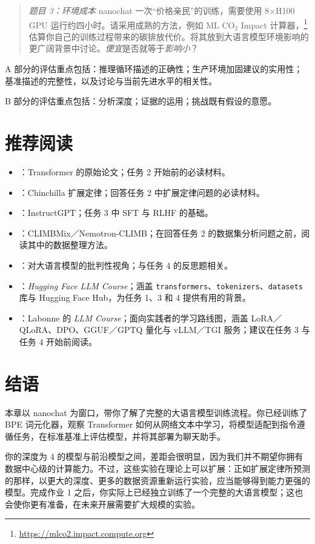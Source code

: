 \begin{quote}
{\em 题目 3：环境成本}
nanochat 一次“价格亲民”的训练，需要使用 8$\times$H100 GPU 运行约四小时。请采用成熟的方法，例如 ML CO$_2$ Impact 计算器，\footnote{\url{https://mlco2.impact.compute.org}}估算你自己的训练过程带来的碳排放代价。将其放到大语言模型环境影响的更广阔背景中讨论。{\em 便宜}是否就等于{\em 影响小}？
\end{quote}

A 部分的评估重点包括：推理循环描述的正确性；生产环境加固建议的实用性；基准描述的完整性，以及讨论与当前先进水平的相关性。

B 部分的评估重点包括：分析深度；证据的运用；挑战既有假设的意愿。

\section{推荐阅读}
\label{sec:reading}

\begin{itemize}
    \item \citet{vaswani2017attention}：Transformer 的原始论文；任务 2 开始前的必读材料。
    \item \citet{10.5555/3600270.3602446}：Chinchilla 扩展定律；回答任务 2 中扩展定律问题的必读材料。
    \item \citet{ouyang2022training}：InstructGPT；任务 3 中 SFT 与 RLHF 的基础。
    \item \citet{diao2026nemotron}：CLIMBMix／Nemotron-CLIMB；在回答任务 2 的数据集分析问题之前，阅读其中的数据整理方法。
    \item \citet{bender2021dangers}：对大语言模型的批判性视角；与任务 4 的反思题相关。
    \item \citet{huggingface2022course}：\textit{Hugging Face LLM Course}；涵盖 \texttt{transformers}、\texttt{tokenizers}、\texttt{datasets} 库与 Hugging Face Hub，为任务 1、3 和 4 提供有用的背景。
    \item \citet{labonne2023llmcourse}：Labonne 的 \textit{LLM Course}；面向实践者的学习路线图，涵盖 LoRA／QLoRA、DPO、GGUF／GPTQ 量化与 vLLM／TGI 服务；建议在任务 3 与任务 4 开始前阅读。
\end{itemize}

\section{结语}
\label{sec:conclusion}

本章以 nanochat 为窗口，带你了解了完整的大语言模型训练流程。你已经训练了 BPE 词元化器，观察 Transformer 如何从网络文本中学习，将模型适配到指令遵循任务，在标准基准上评估模型，并将其部署为聊天助手。

你的深度为 4 的模型与前沿模型之间，差距会很明显，因为我们并不期望你拥有数据中心级的计算能力。不过，这些实验在理论上可以扩展：正如扩展定律所预测的那样，以更大的深度、更多的数据资源重新运行实验，应当能够得到能力更强的模型。完成作业 1 之后，你实际上已经独立训练了一个完整的大语言模型；这也会使你更有准备，在未来开展需要扩大规模的实验。



